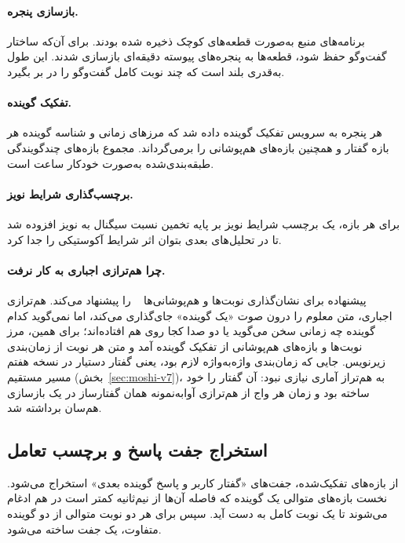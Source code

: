 \paragraph{بازسازی پنجره.} برنامه‌های منبع به‌صورت قطعه‌های کوچک ذخیره شده
بودند. برای آن‌که ساختار گفت‌وگو حفظ شود، قطعه‌ها به پنجره‌های پیوسته
 دقیقه‌ای بازسازی شدند. این طول به‌قدری بلند است که چند نوبت کامل
گفت‌وگو را در بر بگیرد.

\paragraph{تفکیک گوینده.} هر پنجره به سرویس تفکیک گوینده داده شد که مرزهای
زمانی و شناسه گوینده هر بازه گفتار و همچنین بازه‌های هم‌پوشانی را
برمی‌گرداند. مجموع بازه‌های چند‌گویندگی طبقه‌بندی‌شده به‌صورت خودکار
 ساعت است.

\paragraph{برچسب‌گذاری شرایط نویز.} برای هر بازه، یک برچسب شرایط نویز بر
پایه تخمین نسبت سیگنال به نویز افزوده شد تا در تحلیل‌های بعدی بتوان اثر
شرایط آکوستیکی را جدا کرد.

\paragraph{چرا هم‌ترازی اجباری  به کار نرفت.} پیشنهاده برای نشان‌گذاری
نوبت‌ها و هم‌پوشانی‌ها ~\cite{mcauliffe2017mfa}
را پیشنهاد می‌کند. هم‌ترازی اجباری، متن معلوم را درون صوت «یک گوینده» جای‌گذاری
می‌کند، اما نمی‌گوید کدام گوینده چه زمانی سخن می‌گوید یا دو صدا کجا روی هم
افتاده‌اند؛ برای همین، مرز نوبت‌ها و بازه‌های هم‌پوشانی از تفکیک گوینده آمد و
متن هر نوبت از زمان‌بندی زیرنویس. جایی که زمان‌بندی واژه‌به‌واژه لازم بود، یعنی
گفتار دستیار در نسخه هفتم مسیر مستقیم (بخش~\ref{sec:moshi-v7})، به هم‌تراز
آماری نیازی نبود: آن گفتار را خود  ساخته بود و زمان هر واج از
هم‌ترازی آوا‌به‌نمونه همان گفتارساز در یک بازسازی هم‌سان برداشته شد.

\subsection{استخراج جفت پاسخ و برچسب تعامل}
\label{sec:pairs}

از بازه‌های تفکیک‌شده، جفت‌های «گفتار کاربر و پاسخ گوینده بعدی» استخراج
می‌شود. نخست بازه‌های متوالی یک گوینده که فاصله آن‌ها از نیم‌ثانیه کمتر
است در هم ادغام می‌شوند تا یک نوبت کامل به دست آید. سپس برای هر دو نوبت
متوالی از دو گوینده متفاوت، یک جفت ساخته می‌شود.

